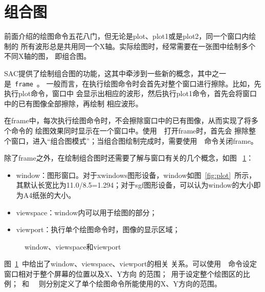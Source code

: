 \section{组合图}
\label{sec:composite-plots}

前面介绍的绘图命令五花八门，但无论是plot、plot1或是plot2，同一个窗口内绘制的
所有波形总是共用同一个X轴。实际绘图时，经常需要在一张图中绘制多个不同X轴的图，
即组合图。

SAC提供了绘制组合图的功能，这其中牵涉到一些新的概念，其中之一是~\verb+frame+~。
一般而言，在执行绘图命令时会首先对整个窗口进行擦除。比如，先执行plot命令，窗口中
会显示出相应的波形，然后执行plot1命令，首先会将窗口中的已有图像全部擦除，再绘制
相应波形。

在frame中，每次执行绘图命令时，不会擦除窗口中的已有图像，从而实现了将多个命令的
绘图效果同时显示在一个窗口中。使用~~打开frame时，首先会
擦除整个窗口，进入``组合图模式''；当组合图绘制完成时，需要使用~~命令关闭frame。

除了frame之外，在绘制组合图时还需要了解与窗口有关的几个概念，如图
~\ref{fig:window-viewspace-viewport}：
\begin{itemize}
\item window：图形窗口。对于xwindows图形设备，window如图~\ref{fig:plot}~所示，
    其默认长宽比为11.0/8.5=1.294；对于sgf图形设备，可以认为window的大小即为A4纸张的大小。
\item viewspace：window内可以用于绘图的部分；
\item viewport：执行单个绘图命令时，图像的显示区域；
\end{itemize}

\begin{figure}[H]
\centering
{}
\caption{window、viewspace和viewport}
\label{fig:window-viewspace-viewport}
\end{figure}

图~\ref{fig:window-viewspace-viewport}~中给出了window、viewspace、viewport的相关
关系。可以使用~~命令设定窗口相对于整个屏幕的位置以及X、Y方向
的范围；~用于设定整个绘图区的比例；~和
~~则分别定义了单个绘图命令所能使用的X、Y方向的范围。

